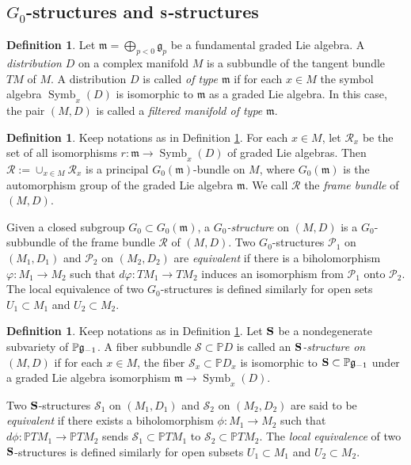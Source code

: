 \documentclass[12pt]{amsart}
\theoremstyle{plain}
\theoremstyle{definition}
\newtheorem{definition} [theorem] {Definition}
\def\Symb{\operatorname{Symb}}
\begin{document}
\subsection{$G_0$-structures and ${\bf S}$-structures}

\begin{definition}\label{distribution type} Let $\mathfrak m=\bigoplus_{p<0}\mathfrak g_{p}$ be a fundamental graded Lie algebra. A \emph{distribution} $D$ on a complex manifold $M$ is a subbundle of the tangent bundle $TM$ of $M$. A distribution $D$ is called {\it of type $\mathfrak m$} if for each $x \in M$ the symbol algebra $\Symb_x(D)$ is isomorphic to $\mathfrak m$ as a graded Lie algebra. In this case, the pair $(M,D)$ is called a \emph{filtered manifold of type} $\mathfrak m$.
\end{definition}


\begin{definition}  \label{G_0 structure} Keep notations as in Definition \ref{distribution type}.
For each $x \in M$, let $\mathscr R_x $ be the set of all isomorphisms $r \colon \mathfrak m\rightarrow \Symb_x(D)$ of graded Lie algebras. Then $\mathscr R:=\cup_{x\in M}\mathscr R_x $ is a principal $G_0(\mathfrak m)$-bundle on $M$, where  $G_{0}(\mathfrak m)$ is the automorphism group  of   the graded Lie algebra $\mathfrak m$.
We call   $\mathscr R$  the \emph{frame bundle} of $(M,D)$.

Given a closed subgroup $G_0\subset G_{0}(\mathfrak m)$, a \emph{$G_0$-structure} on $(M,D)$ is a $G_0$-subbundle of the frame bundle $\mathscr R$ of $(M,D)$. Two $G_0$-structures $\mathscr P_1$ on $(M_1,D_1)$ and $\mathscr P_2$ on $(M_2,D_2)$ are \emph{equivalent} if there is a biholomorphism $\varphi: M_1 \rightarrow M_2$ such that $d\varphi: TM_1 \rightarrow TM_2$ induces an isomorphism from $\mathscr P_1$ onto $\mathscr P_2$.
The local equivalence of two $G_0$-structures is defined similarly for open sets $U_1 \subset M_1$ and $U_2 \subset M_2$.
 \end{definition}

\begin{definition}\label{cone structure}  Keep notations as in Definition \ref{distribution type}. Let ${\bf S}$ be a nondegenerate subvariety of $\mathbb P {\frak g_{-1}} $.
A fiber subbundle $\mathcal S \subset \mathbb P D$ is called an  {\it ${{\bf S}}$-structure on $(M,D)$} if for each $x \in M$, the fiber $\mathcal S_x \subset \mathbb P D_x$ is isomorphic to ${\bf S} \subset \mathbb P {\frak g_{-1}}$ under a graded Lie algebra isomorphism
$  \mathfrak m \rightarrow   \Symb_x(D) $.

Two ${\bf S}$-structures $\mathcal S_1$ on $(M_1,D_1)$ and $\mathcal S_2$ on $(M_2,D_2)$ are said to be \emph{equivalent} if there exists a biholomorphism $\phi \colon M_1 \to M_2$ such that $d\phi \colon \mathbb P TM_1 \to \mathbb P TM_2$ sends $\mathcal S_1 \subset \mathbb P TM_1$ to $\mathcal S_2 \subset \mathbb P TM_2$. The \emph{local equivalence} of two ${\bf S}$-structures is defined similarly for   open subsets $U_1\subset M_1$ and $U_2 \subset M_2$.
\end{definition}
\end{document}
